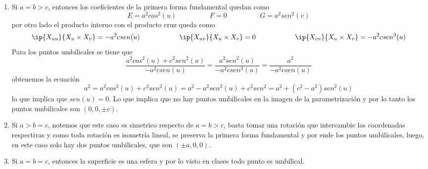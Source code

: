 \documentclass{article}
\begin{document}
\begin{enumerate}
    \item Si $a=b>c$, entonces los coeficientes de la primera forma fundamental quedan como
    \begin{equation*}
        E=a^{2}cos^{2}(u)\hspace{2cm}F=0\hspace{2cm}G=a^{2}sen^{2}(v)
    \end{equation*}
    por otro lado el producto interno con el producto cruz queda como
    \begin{equation*}
        \ip{X_{uu}}{X_{u}\times X_{v}}=-a^{2}csen(u)\hspace{2cm}\ip{X_{uv}}{X_{u}\times X_{v}}=0
        \hspace{2cm}\ip{X_{vv}}{X_{u}\times X_{v}}=-a^{2}csen^{3}(u)
    \end{equation*}
    Para los puntos umbilicales se tiene que
    \begin{equation*}
        \frac{a^{2}cos^{2}(u)+c^{2}sen^{2}(u)}{-a^{2}csen(u)}=\frac{a^{2}sen^{2}(u)}
        {-a^{2}csen^{3}(u)}=\frac{a^{2}}{-a^{2}csen(u)}
    \end{equation*}
    obtenemos la ecuación
    \begin{equation*}
        a^{2}=a^{2}cos^{2}(u)+c^{2}sen^{2}(u)=a^{2}-a^{2}sen^{2}(u)+c^{2}sen^{2}
        =a^{2}+(c^{2}-a^{2})sen^{2}(u)
    \end{equation*}
    lo que implica que $sen(u)=0$. Lo que implica que no hay puntos umbilicales en la imagen de la
    parametrización y por lo tanto los puntos umbilicales son $(0,0,\pm c)$.
    
    \item Si $a>b=c$, notemos que este caso es simetrico respecto de $a=b>c$, basta tomar una
    rotación que intercambie las coordenadas respectivas y como toda rotación es isometría lineal,
    se preserva la primera forma fundamental y por ende los puntos umbilicales, luego, en este caso
    solo hay dos puntos umbilicales, que son $(\pm a,0,0)$.

    \item Si $a=b=c$, entonces la superficie es una esfera y por lo visto en clases todo punto es
    umbilical.
\end{enumerate}
\end{document}
